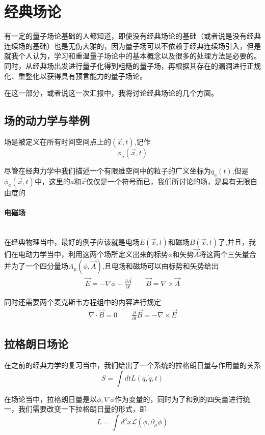 \documentclass{article}
\begin{document}
\section{经典场论}
有一定的量子场论基础的人都知道，即使没有经典场论的基础（或者说是没有经典连续场的基础）也是无伤大雅的，因为量子场可以不依赖于经典连续场引入，但是就我个人认为，学习和重温量子场论中的基本概念以及很多的处理方法是必要的。同时，从经典场出发进行量子化得到粗糙的量子场，再根据其存在的漏洞进行正规化、重整化以获得具有预言能力的量子场论。

在这一部分，或者说这一次汇报中，我将讨论经典场论的几个方面。

\subsection{场的动力学与举例}
场是被定义在所有时间空间点上的$(\vec{x},t)$,记作$$\phi_a(\vec{x},t)$$

尽管在经典力学中我们描述一个有限维空间中的粒子的广义坐标为$q_a(t)$,但是$\phi_a(\vec{x},t)$中，这里的$a$和$\vec{x}$仅仅是一个符号而已，我们所讨论的场，是具有无限自由度的
\paragraph{电磁场}\ \\
在经典物理当中，最好的例子应该就是电场$E(\vec{x},t)$和磁场$B(\vec{x},t)$了,并且，我们在电动力学当中，利用这两个场所定义出来的标势$\phi$和矢势$\vec{A}$将这两个三矢量合并为了一个四分量场$A_\mu(\phi,\vec{A})$,且电场和磁场可以由标势和矢势给出
\begin{align*}
    \vec{E}=-\nabla\phi-\frac{\partial\vec{A}}{\partial t}\quad\quad\vec{B}=\nabla\times\vec{A}
\end{align*}

同时还需要两个麦克斯韦方程组中的内容进行规定
\begin{align*}
    \nabla\cdot\vec{B}=0\quad\quad\frac{\partial}{\partial t}\vec{B}=-\nabla\times\vec{E}
\end{align*}




\subsection{拉格朗日场论}
在之前的经典力学的复习当中，我们给出了一个系统的拉格朗日量与作用量的关系
\[S=\int dt L(q,\dot{q},t)\]

在场论当中，拉格朗日量是以$\phi,\nabla\phi$作为变量的，同时为了和别的四矢量进行统一，我们需要改变一下拉格朗日量的形式，即
\begin{equation*}
    L=\int d^3x\mathcal{L}(\phi,\partial_\mu\phi)
\end{equation*}
\end{document}
